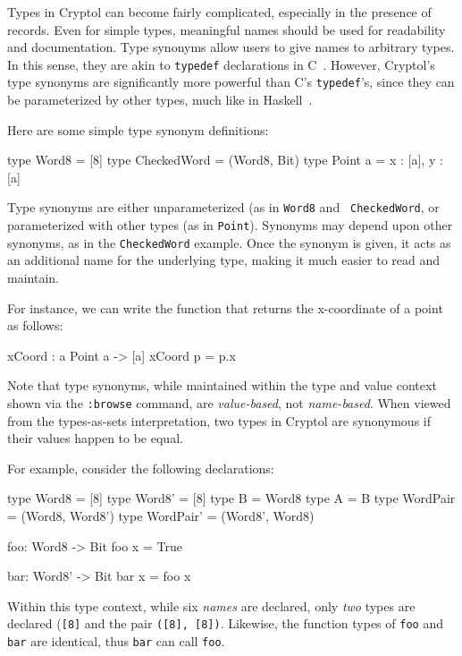 

Types in Cryptol can become fairly complicated, especially in the
presence of records.  Even for simple types, meaningful names should
be used for readability and documentation.  Type synonyms allow users
to give names to arbitrary types.  In this sense, they are akin to
{\tt typedef} declarations in C~\cite{TheCProgrammingLanguage}.
However, Cryptol's type synonyms are significantly more powerful than
C's {\tt typedef}'s, since they can be parameterized by other types,
much like in Haskell~\cite{Has98}.


Here are some simple type synonym definitions:
\begin{code}
  type Word8       = [8]
  type CheckedWord = (Word8, Bit)
  type Point a     = {x : [a], y : [a]}
\end{code}


Type synonyms are either unparameterized (as in {\tt Word8} and {\tt
  CheckedWord}, or parameterized with other types (as in {\tt Point}).
Synonyms may depend upon other synonyms, as in the {\tt CheckedWord}
example.  Once the synonym is given, it acts as an additional name for
the underlying type, making it much easier to read and
maintain.  

For instance, we can write the function that returns the x-coordinate
of a point as follows:
\begin{code}
  xCoord : {a} Point a -> [a]
  xCoord p = p.x
\end{code}

Note that type synonyms, while maintained within the type and value
context shown via the \texttt{:browse} command, are
\emph{value-based}, not \emph{name-based}.  When viewed from the
types-as-sets interpretation, two types in Cryptol are synonymous if
their values happen to be equal.  

For example, consider the following declarations:
\begin{code}
  type Word8     = [8]
  type Word8'    = [8]
  type B         = Word8
  type A         = B
  type WordPair  = (Word8, Word8')
  type WordPair' = (Word8', Word8)

  foo: Word8 -> Bit
  foo x = True

  bar: Word8' -> Bit
  bar x = foo x
\end{code}
Within this type context, while six \emph{names} are declared, only
\emph{two} types are declared (\texttt{[8]} and the pair \texttt{([8],
[8])}.  Likewise, the function types of \texttt{foo} and \texttt{bar}
are identical, thus \texttt{bar} can call \texttt{foo}.

